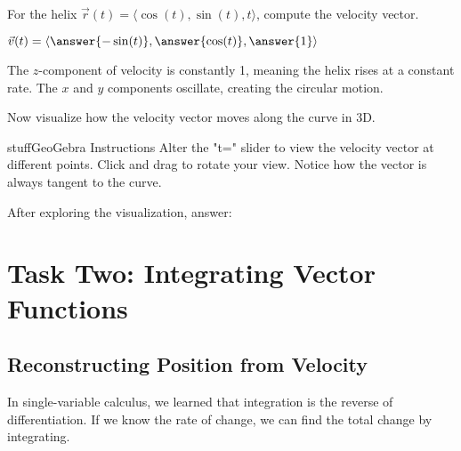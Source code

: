 \documentclass{ximera}
\begin{document}
\begin{problem}
For the helix $\vec{r}(t) = \langle \cos(t), \sin(t), t \rangle$, compute the velocity vector.

$\vec{v}(t) = \langle \answer{-\sin(t)}, \answer{\cos(t)}, \answer{1} \rangle$

\begin{feedback}
The $z$-component of velocity is constantly 1, meaning the helix rises at a constant rate. The $x$ and $y$ components oscillate, creating the circular motion.
\end{feedback}
\end{problem}

\begin{problem}
Now visualize how the velocity vector moves along the curve in 3D.

\begin{expandable}{stuff}{GeoGebra Instructions}
    Alter the "t=" slider to view the velocity vector at different points. Click and drag to rotate your view. Notice how the vector is always tangent to the curve.
\end{expandable}

\begin{center}
\end{center}

After exploring the visualization, answer:
\begin{selectAll}
\end{selectAll}
\end{problem}

\section*{Task Two: Integrating Vector Functions}

\subsection*{Reconstructing Position from Velocity}

In single-variable calculus, we learned that integration is the reverse of differentiation. If we know the rate of change, we can find the total change by integrating.
\end{document}
